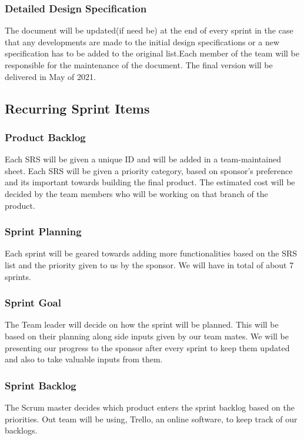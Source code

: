 \subsubsection{Detailed Design Specification}
The document will be updated(if need be) at the end of every sprint in the case that any developments are made to the initial design specifications or a new specification has to be added to the original list.Each member of the team will be responsible for the maintenance of the document. The final version will be delivered in May of 2021.

\subsection{Recurring Sprint Items}

\subsubsection{Product Backlog}
Each SRS will be given a unique ID and will be added in a team-maintained sheet. Each SRS will be given a priority category, based on sponsor's preference and its important towards building the final product. The estimated cost will be decided by the team members who will be working on that branch of the product.

\subsubsection{Sprint Planning}
Each sprint will be geared towards adding more functionalities based on the SRS list and the priority given to us by the sponsor. We will have in total of about 7 sprints. 
\subsubsection{Sprint Goal}
 The Team leader will decide on how the sprint will be planned. This will be based on their planning along side inputs given by our team mates. We will be presenting our progress to  the sponsor after every sprint to keep them updated and also to take valuable inputs from them.

\subsubsection{Sprint Backlog}
The Scrum master decides which product enters the sprint backlog based on the priorities. Out team will be using, Trello, an online software, to keep track of our backlogs.

